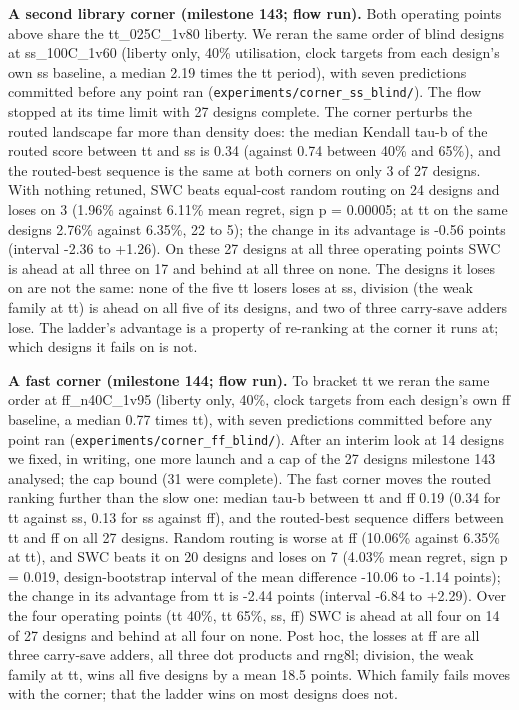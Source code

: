 \documentclass[conference]{IEEEtran}
\begin{document}
\textbf{A second library corner (milestone 143; flow run).} Both
operating points above share the tt\_025C\_1v80 liberty. We reran the
same order of blind designs at ss\_100C\_1v60 (liberty only, 40\%
utilisation, clock targets from each design's own ss baseline, a median
2.19 times the tt period), with seven predictions committed before any
point ran (\texttt{experiments/\allowbreak{}corner\_\allowbreak{}ss\_\allowbreak{}blind/\allowbreak{}}). The flow stopped at
its time limit with 27 designs complete. The corner perturbs the routed
landscape far more than density does: the median Kendall tau-b of the
routed score between tt and ss is 0.34 (against 0.74 between 40\% and
65\%), and the routed-best sequence is the same at both corners on only
3 of 27 designs. With nothing retuned, SWC beats equal-cost random
routing on 24 designs and loses on 3 (1.96\% against 6.11\% mean regret,
sign p = 0.00005; at tt on the same designs 2.76\% against 6.35\%, 22 to
5); the change in its advantage is -0.56 points (interval -2.36 to
+1.26). On these 27 designs at all three operating points SWC is ahead
at all three on 17 and behind at all three on none. The designs it loses
on are not the same: none of the five tt losers loses at ss, division
(the weak family at tt) is ahead on all five of its designs, and two of
three carry-save adders lose. The ladder's advantage is a property of
re-ranking at the corner it runs at; which designs it fails on is not.

\textbf{A fast corner (milestone 144; flow run).} To bracket tt we reran
the same order at ff\_n40C\_1v95 (liberty only, 40\%, clock targets from
each design's own ff baseline, a median 0.77 times tt), with seven
predictions committed before any point ran
(\texttt{experiments/\allowbreak{}corner\_\allowbreak{}ff\_\allowbreak{}blind/\allowbreak{}}). After an interim look at 14
designs we fixed, in writing, one more launch and a cap of the 27
designs milestone 143 analysed; the cap bound (31 were complete). The
fast corner moves the routed ranking further than the slow one: median
tau-b between tt and ff 0.19 (0.34 for tt against ss, 0.13 for ss
against ff), and the routed-best sequence differs between tt and ff on
all 27 designs. Random routing is worse at ff (10.06\% against 6.35\% at
tt), and SWC beats it on 20 designs and loses on 7 (4.03\% mean regret,
sign p = 0.019, design-bootstrap interval of the mean difference -10.06
to -1.14 points); the change in its advantage from tt is -2.44 points
(interval -6.84 to +2.29). Over the four operating points (tt 40\%, tt
65\%, ss, ff) SWC is ahead at all four on 14 of 27 designs and behind at
all four on none. Post hoc, the losses at ff are all three carry-save
adders, all three dot products and rng8l; division, the weak family at
tt, wins all five designs by a mean 18.5 points. Which family fails
moves with the corner; that the ladder wins on most designs does not.
\end{document}
